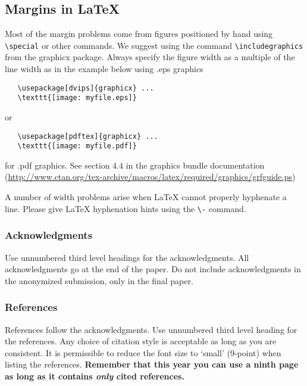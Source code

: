 \documentclass{article} %
\begin{document}
\subsection{Margins in LaTeX}
 
Most of the margin problems come from figures positioned by hand using
\verb+\special+ or other commands. We suggest using the command
\verb+\includegraphics+
from the graphicx package. Always specify the figure width as a multiple of
the line width as in the example below using .eps graphics
\begin{verbatim}
   \usepackage[dvips]{graphicx} ... 
   \texttt{[image: myfile.eps]} 
\end{verbatim}
or %
\begin{verbatim}
   \usepackage[pdftex]{graphicx} ... 
   \texttt{[image: myfile.pdf]} 
\end{verbatim}
for .pdf graphics. 
See section 4.4 in the graphics bundle documentation (\url{http://www.ctan.org/tex-archive/macros/latex/required/graphics/grfguide.ps}) 
 
A number of width problems arise when LaTeX cannot properly hyphenate a
line. Please give LaTeX hyphenation hints using the \verb+\-+ command.


\subsubsection*{Acknowledgments}

Use unnumbered third level headings for the acknowledgments. All
acknowledgments go at the end of the paper. Do not include 
acknowledgments in the anonymized submission, only in the 
final paper. 

\subsubsection*{References}

References follow the acknowledgments. Use unnumbered third level heading for
the references. Any choice of citation style is acceptable as long as you are
consistent. It is permissible to reduce the font size to `small' (9-point) 
when listing the references. {\bf Remember that this year you can use
a ninth page as long as it contains \emph{only} cited references.}
\end{document}
